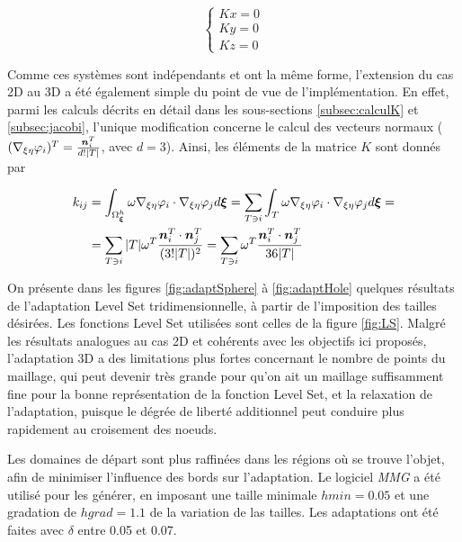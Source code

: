 \begin{equation*}
	\begin{cases}
		Kx = 0 \\
		Ky = 0 \\
		Kz = 0
	\end{cases}
\end{equation*}

\indent Comme ces systèmes sont indépendants et ont la même forme, l'extension du cas 2D au 3D a été également simple du point de vue de l'implémentation. En effet, parmi les calculs décrits en détail dans les sous-sections \ref{subsec:calculK} et \ref{subsec:jacobi}, l'unique modification concerne le calcul des vecteurs normaux (\((\nabla_{\xi\eta} \varphi_i)^T = \frac{\boldsymbol{n}_i^T}{d\text{!}|T|}\), avec \(d=3\)). Ainsi, les éléments de la matrice \(K\) sont donnés par


\begin{equation*}
\begin{gathered}
\begin{aligned}
	k_{ij} & = \int_{\Omega_{\boldsymbol{\xi}}^h}{ \omega \nabla_{\xi\eta} \varphi_i  \cdot \nabla_{\xi\eta} \varphi_j  d\boldsymbol{\xi}} = \sum_{T \ni i} {\int_{T}{ \omega \nabla_{\xi\eta} \varphi_i \cdot \nabla_{\xi\eta} \varphi_j  d\boldsymbol{\xi}}} = \\
	       &  = \sum_{T \ni i}
	              { 
	                     { |T|\omega^T \frac{\boldsymbol{n}_i^T\cdot \boldsymbol{n}_j^T}{(3\text{!}|T|)^2}
	                     }
	              }
	          = \sum_{T \ni i}
	              { 
	                     { \omega^T \frac{\boldsymbol{n}_i^T\cdot \boldsymbol{n}_j^T}{36|T|}
	                     }
	              }	              
\end{aligned}
\end{gathered}
\end{equation*}

\indent On présente dans les figures \ref{fig:adaptSphere} à \ref{fig:adaptHole} quelques résultats de l'adaptation Level Set tridimensionnelle, à partir de l'imposition des tailles désirées. Les fonctions Level Set utilisées sont celles de la figure \ref{fig:LS}. Malgré les résultats analogues au cas 2D et cohérents avec les objectifs ici proposés, l'adaptation 3D a des limitations plus fortes concernant le nombre de points du maillage, qui peut devenir très grande pour qu'on ait un maillage suffisamment fine pour la bonne représentation de la fonction Level Set, et la relaxation de l'adaptation, puisque le dégrée de liberté additionnel peut conduire plus rapidement au croisement des noeuds.

\indent Les domaines de départ sont plus raffinées dans les régions où se trouve l'objet, afin de minimiser l'influence des bords sur l'adaptation. Le logiciel \emph{MMG} a été utilisé pour les générer, en imposant une taille minimale \(hmin =  0.05\) et une gradation de \(hgrad = 1.1\) de la variation de las tailles. Les adaptations ont été faites avec \(\delta\) entre 0.05 et 0.07.

